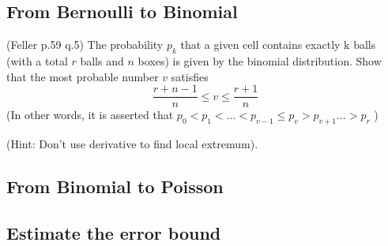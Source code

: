 \subsection{From Bernoulli to Binomial}
\begin{exercise}
    (Feller p.59 q.5) The probability \(p_{k}\) that a given  cell contains exactly k balls (with a total \(r\) balls and \(n\) boxes) is given by the binomial distribution. 
    Show that the most probable number \(v\) satisfies 
    \[
        \frac{r+n-1}{n} \leq  v \leq \frac{r+1}{n}
    \]
    (In other words, it is asserted that \(p_0 < p_1 < \dots < p_{v-1} \leq p_{v} >  p_{v+1} \dots > p_r \) )
\end{exercise}
(Hint: Don't use derivative to find local extremum).

\subsection{From Binomial to Poisson}


\subsection{Estimate the error bound}


